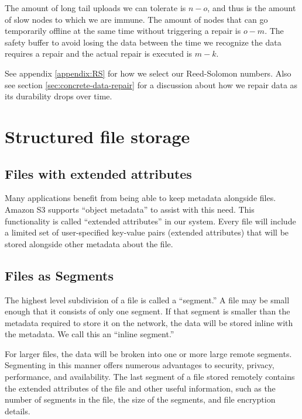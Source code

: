 \documentclass[11pt,fleqn,openany]{book}
\begin{document}
The amount of long tail uploads we can tolerate is $n-o$, and thus is the amount
of slow nodes to which we are immune.  The amount of nodes that can go
temporarily offline at the same time without triggering a repair is $o-m$. The
safety buffer to avoid losing the data between the time we recognize the data
requires a repair and the actual repair is executed is $m-k$.

See appendix \ref{appendix:RS} for how we select our Reed-Solomon numbers.
Also see section \ref{sec:concrete-data-repair} for a discussion about
how we repair data as its durability drops over time.

\section{Structured file storage}\label{sec:structured-file-storage}

\subsection{Files with extended attributes}

Many applications benefit from being able to keep metadata alongside files.
Amazon S3 supports ``object metadata'' \cite{s3-object-meta} to assist with this
need. This functionality is called ``extended attributes'' in our system.
Every file will include a limited set of user-specified key-value pairs
(extended attributes) that will be stored alongside other metadata about the
file.

\subsection{Files as Segments}

The highest level subdivision of a file is called a ``segment.''
A file may be small enough that it consists of only one segment.
If that segment is smaller than the metadata required to store it on the
network, the data will be stored inline with the metadata. We call this an
``inline segment.''

For larger files, the data will be broken
into one or more large remote segments. Segmenting in this manner offers
numerous advantages to security, privacy, performance, and availability. The
last segment of a file stored remotely contains the extended attributes of
the file and other useful information, such as the number of segments in the
file, the size of the segments, and file encryption details.
\end{document}
